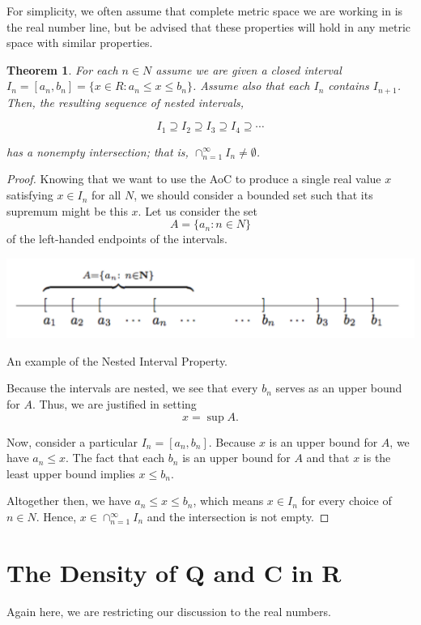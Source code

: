 \documentclass{tufte-book}
\newtheorem{theorem}{Theorem}[chapter]
\theoremstyle{definition}
\numberwithin{section}{chapter}
\begin{document}
For simplicity, we often assume that complete metric space we are working in is the real number line, but be advised that these properties will hold in any metric space with similar properties.

\begin{theorem}  For each $n \in N$ assume we are given a closed interval $I_n = [a_n , b_n] = \{ x \in R : a_n \leq x \leq b_n\}$.  Assume also that each $I_n$ contains $I_{n+1}$.  Then, the resulting sequence of nested intervals, 

\[I_1 \supseteq I_2 \supseteq I_3 \supseteq I_4 \supseteq \cdots \]

has a nonempty intersection; that is, $\cap_{n=1}^{\infty} I_n \neq \emptyset$.
\end{theorem}

\begin{proof}
Knowing that we want to use the AoC to produce a single real value  $x$ satisfying $x \in I_n$ for all $N$, we should consider a bounded set such that its supremum might be this $x$.  Let us consider the set 
\[ A = \{a_n : n \in N\}\]
of the left-handed endpoints of the intervals.

\begin{marginfigure}
  \includegraphics{NIP.pdf}
  \caption{An example of the Nested Interval Property.}
\end{marginfigure}


Because the intervals are nested, we see that every $b_n$ serves as an upper bound for $A$.  Thus, we are justified in setting
\[ x = \sup A.\]

Now, consider a particular $I_n = [a_n , b_n]$.  Because $x$ is an upper bound for $A$, we have $a_n \leq x$.  The fact that each $b_n$ is an upper bound for $A$ and that $x$ is the least upper bound implies $x\leq b_n$.

Altogether then, we have $a_n \leq x \leq b_n$, which means $x \in I_n$ for every choice of $n \in N$.  Hence, $x \in \cap_{n=1}^{\infty} I_n$ and the intersection is not empty.
\end{proof}


\section{The Density of Q and C in R}
Again here, we are restricting our discussion to the real numbers.  
\end{document}
